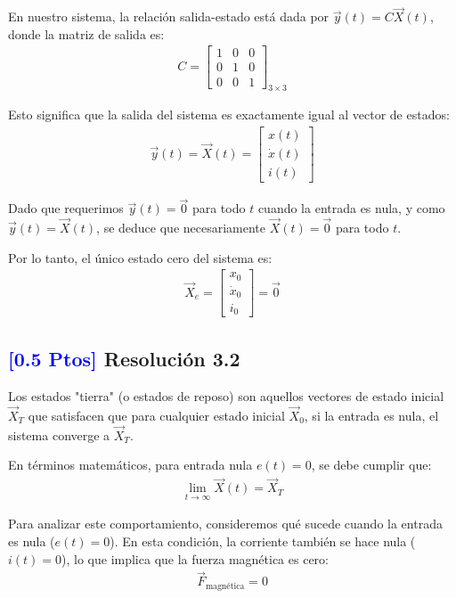 \documentclass[
  11pt,
  letterpaper,
   addpoints,
   answers
  ]{exam}
\begin{document}
\begin{solution}
En nuestro sistema, la relación salida-estado está dada por $\vec{y}(t) = C\vec{X}(t)$, donde la matriz de salida es:
\begin{align}
C = \begin{bmatrix}
1 & 0 & 0 \\
0 & 1 & 0 \\
0 & 0 & 1
\end{bmatrix}_{3 \times 3}
\end{align}

Esto significa que la salida del sistema es exactamente igual al vector de estados:
\begin{align}
\vec{y}(t) = \vec{X}(t) = \begin{bmatrix}
x(t) \\
\dot{x}(t) \\
i(t)
\end{bmatrix}
\end{align}

Dado que requerimos $\vec{y}(t) = \vec{0}$ para todo $t$ cuando la entrada es nula, y como $\vec{y}(t) = \vec{X}(t)$, se deduce que necesariamente $\vec{X}(t) = \vec{0}$ para todo $t$.

Por lo tanto, el único estado cero del sistema es:
\begin{align}
\vec{X}_e = \begin{bmatrix}
x_0 \\
\dot{x}_0 \\
i_0
\end{bmatrix} = \vec{0}
\end{align}

\subsection*{\textcolor{blue}{[0.5 Ptos]} Resolución 3.2}

Los estados "tierra" (o estados de reposo) son aquellos vectores de estado inicial $\vec{X}_T$ que satisfacen que para cualquier estado inicial $\vec{X}_0$, si la entrada es nula, el sistema converge a $\vec{X}_T$. 

En términos matemáticos, para entrada nula $e(t) = 0$, se debe cumplir que:
\begin{align}
\lim_{t \to \infty} \vec{X}(t) = \vec{X}_T
\end{align}

Para analizar este comportamiento, consideremos qué sucede cuando la entrada es nula ($e(t) = 0$). En esta condición, la corriente también se hace nula ($i(t) = 0$), lo que implica que la fuerza magnética es cero:
\begin{align}
\vec{F}_{\text{magnética}} = 0
\end{align}


\end{solution}
\end{document}
